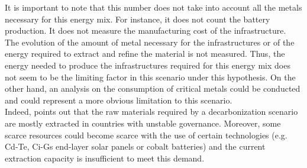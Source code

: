 \documentclass[conference]{IEEEtran}
\begin{document}
It is important to note that this number does not take into account all the metals necessary for this energy mix. For instance, it does not count the battery production. It does not measure the manufacturing cost of the infrastructure. The evolution of the amount of metal necessary for the infrastructures or of the energy required to extract and refine the material is not measured. 
Thus, the energy needed to produce the infrastructures required for this energy mix does not seem to be the limiting factor in this scenario under this hypothesis. On the other hand, an analysis on the consumption of critical metals could be conducted and could represent a more obvious limitation to this scenario.
\\
Indeed, \cite{watari_sustainable_2021} points out that the raw materials required by a decarbonization scenario are mostly extracted in countries with unstable governance. Moreover, some scarce resources could become scarce with the use of certain technologies (e.g. Cd-Te, Ci-Gs end-layer solar panels or cobalt batteries) and the current extraction capacity is insufficient to meet this demand. 
\end{document}
